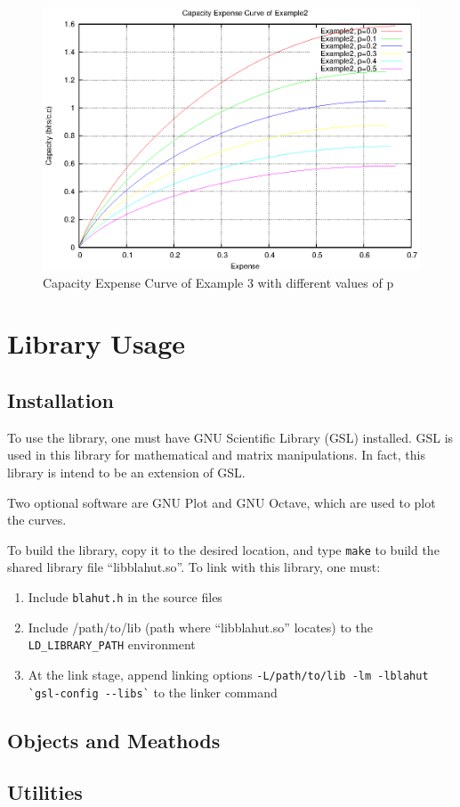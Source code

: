 \documentclass[a4paper,10pt]{article}
\begin{document}
\begin{figure}
 \centering
 \includegraphics[bb=50 50 410 302]{pic/example2_cap.eps}
 \caption{Capacity Expense Curve of Example 3 with different values of p}
 \label{fig:example2_cap}
\end{figure}

\section{Library Usage}
\subsection{Installation}
To use the library, one must have GNU Scientific Library (GSL) installed. GSL is used in this library for mathematical and matrix manipulations. In fact, this library is intend to be an extension of GSL. 

Two optional software are GNU Plot and GNU Octave, which are used to plot the curves.

To build the library, copy it to the desired location, and type \verb|make| to build the shared library file ``libblahut.so''. To link with this library, one must:
\begin{enumerate}
 \item Include \verb|blahut.h| in the source files
 \item Include /path/to/lib (path where ``libblahut.so'' locates) to the \verb|LD_LIBRARY_PATH| environment
 \item At the link stage, append linking options \verb|-L/path/to/lib -lm -lblahut `gsl-config --libs`| to the linker command
\end{enumerate}

\subsection{Objects and Meathods}
\subsection{Utilities}
 
\end{document}
